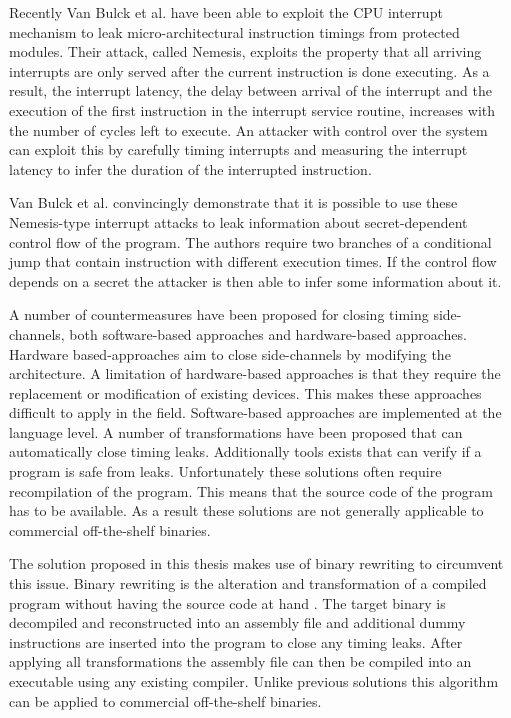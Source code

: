 Recently Van Bulck et al. \cite{Nemesis} have been able to exploit the CPU interrupt mechanism to leak micro-architectural instruction timings from protected modules. 
Their attack, called Nemesis, exploits the property that all arriving interrupts are only served after the current instruction is done executing. 
As a result, the interrupt latency, the delay between arrival of the interrupt and the execution of the first instruction in the interrupt service routine, increases with the number of cycles left to execute.
An attacker with control over the system can exploit this by carefully timing interrupts and measuring the interrupt latency to infer the duration of the interrupted instruction. 

Van Bulck et al. \cite{Nemesis} convincingly demonstrate that it is possible to use these Nemesis-type interrupt attacks to leak information about secret-dependent control flow of the program. 
The authors require two branches of a conditional jump that contain instruction with different execution times. 
If the control flow depends on a secret the attacker is then able to infer some information about it. 

A number of countermeasures have been proposed for closing timing side-channels, both software-based approaches and hardware-based approaches. 
Hardware based-approaches aim to close side-channels by modifying the architecture. 
A limitation of hardware-based approaches is that they require the replacement or modification of existing devices. This makes these approaches difficult
to apply in the field. 
Software-based approaches are implemented at the language level. A number of transformations have been proposed that can automatically close timing leaks. 
Additionally tools exists that can verify if a program is safe from leaks. Unfortunately these solutions often require recompilation of the program. This means
that the source code of the program has to be available. As a result these solutions are not generally applicable to commercial off-the-shelf binaries. 

The solution proposed in this thesis makes use of binary rewriting to circumvent this issue. Binary rewriting is the alteration and transformation of a compiled program without having the source code at hand \cite{rewriting-survey}. 
The target binary is decompiled and reconstructed into an assembly file and additional dummy instructions are inserted into the program to close any timing leaks. 
After applying all transformations the assembly file can then be compiled into an executable using any existing compiler. 
Unlike previous solutions this algorithm can be applied to commercial off-the-shelf binaries. 

